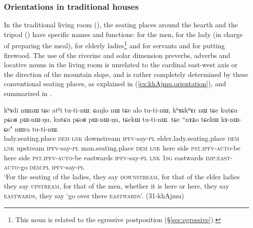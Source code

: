 \subsubsection{Orientations in traditional houses}  \label{sec:orientation.kitchen}
In the traditional living room (), the seating places around the hearth and the tripod () have specific names and functions:  for the men,  for the lady (in charge of preparing the meal),  for elderly ladies\footnote{This noun is related to the egressive postposition  (§\ref{sec:egressive}). } and  for servants and for putting firewood. The use of the riverine and solar dimension preverbs, adverbs and locative nouns in the living room is unrelated to the cardinal east-west axis or the direction of the mountain slope, and is rather completely determined by these conventional seating places, as explained in (\ref{ex:khAjmu.orientation}), and summarized in .

\begin{exe}
\ex \label{ex:khAjmu.orientation}
\gll kʰɤdi nɯnɯ tɕe atʰi tu-ti-nɯ. ɕaŋlo nɯ tɕe alo tu-ti-nɯ,
kʰɤɕkʰɤr nɯ tɕe kutɕu pɕoʁ pɯ-nɯ-ŋu, kutɕu pɕoʁ pɯ-nɯ-ŋu, 
tɕekɯ tu-ti-nɯ. tɕe ``nɤʑo tɕekɯ kɤ-nɯ-ɕe" nɯra tu-ti-nɯ. \\
lady.seating.place \textsc{dem} \textsc{lnk} {downstream} \textsc{ipfv}-say-\textsc{pl} elder.lady.seating.place \textsc{dem} \textsc{lnk} upstream \textsc{ipfv}-say-\textsc{pl} man.seating.place \textsc{dem} \textsc{lnk} here side \textsc{pst}.\textsc{ipfv}-\textsc{auto}-be here side \textsc{pst}.\textsc{ipfv}-\textsc{auto}-be eastwards \textsc{ipfv}-say-\textsc{pl} \textsc{lnk} \textsc{1sg} eastwards \textsc{imp}:\textsc{east}-\textsc{auto}-go \textsc{dem}:\textsc{pl} \textsc{ipfv}-say-\textsc{pl} \\
\glt `For the seating of the ladies, they say \textsc{downstream}, for that of the elder ladies they say \textsc{upstream}, for that of the men, whether it is here or here, they say \textsc{eastwards}, they say `go over there \textsc{eastwards}'. (31-khAjmu)
\end{exe}



